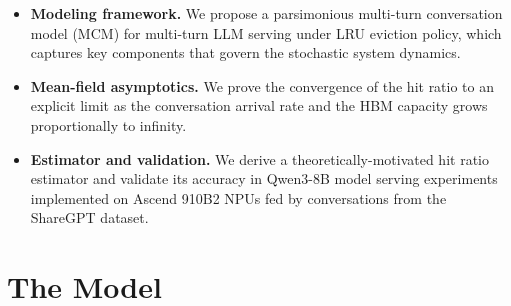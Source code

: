 \documentclass{article}
\theoremstyle{definition}
\begin{document}
\begin{itemize}
    \item \textbf{Modeling framework.} We propose a parsimonious multi-turn conversation model (MCM) for multi-turn LLM serving under LRU eviction policy, which captures key components that govern the stochastic system dynamics.
    \item \textbf{Mean-field asymptotics.} We prove the convergence of the hit ratio to an  explicit limit as the conversation arrival rate and the HBM capacity grows proportionally to infinity.
    \item \textbf{Estimator and validation.} We derive a theoretically-motivated hit ratio estimator and validate its accuracy in Qwen3-8B model serving experiments implemented on Ascend 910B2 NPUs fed by conversations from the ShareGPT dataset.
\end{itemize}

\vspace{-0.2em}

\vspace{-0.5em}
\vspace{-0.5em}

\section{The Model}
\label{sec: Model Settings-short}
\vspace{-0.5em}
\vspace{-0.2em}
\end{document}
